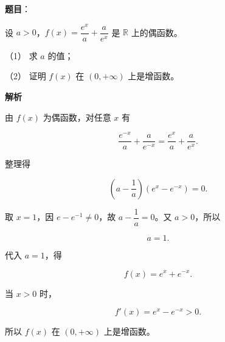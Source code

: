 \begin{answer}

\textbf{题目}：

设 $a>0$，$f(x)=\dfrac{e^x}{a}+\dfrac{a}{e^x}$ 是 $\mathbb R$ 上的偶函数。

（1） 求 $a$ 的值；

（2） 证明 $f(x)$ 在 $(0,+\infty)$ 上是增函数。

\textbf{解析}


由 $f(x)$ 为偶函数，对任意 $x$ 有

\nopagebreak[4]
\[
\frac{e^{-x}}a+\frac{a}{e^{-x}}
=\frac{e^x}a+\frac{a}{e^x}.
\]

整理得

\nopagebreak[4]
\[
\left(a-\frac1a\right)(e^x-e^{-x})=0.
\]

取 $x=1$，因 $e-e^{-1}\ne0$，故 $a-\dfrac1a=0$。又 $a>0$，所以

\nopagebreak[4]
\[
a=1.
\]


代入 $a=1$，得

\nopagebreak[4]
\[
f(x)=e^x+e^{-x}.
\]

当 $x>0$ 时，

\nopagebreak[4]
\[
f'(x)=e^x-e^{-x}>0.
\]

所以 $f(x)$ 在 $(0,+\infty)$ 上是增函数。



\end{answer}
